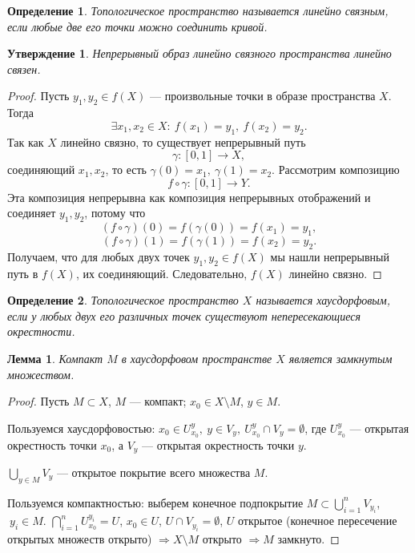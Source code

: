 \documentclass[12pt]{article}
\theoremstyle{plain}
\newtheorem{subtheorem}{Утверждение}[section]
\newtheorem{lemma}{Лемма}[section]
\newtheorem{definition}{Определение}[section]
\begin{document}
    \begin{definition}
        Топологическое пространство называется \textit{линейно связным}, если любые две его точки можно соединить кривой.
    \end{definition}
    \begin{subtheorem}
        Непрерывный образ линейно связного пространства линейно связен.
    \end{subtheorem}
    \begin{proof}
        Пусть $y_1, y_2 \in f(X)$ — произвольные точки в образе пространства $X$. Тогда $$\exists x_1, x_2 \in X: \ f(x_1) = y_1, \ f(x_2) = y_2.$$
        Так как $X$ линейно связно, то существует непрерывный путь 
        \[\gamma: [0,1] \to X,\]
        соединяющий $x_1, x_2$, то есть $\gamma(0) = x_1, \ \gamma(1) = x_2$.
        Рассмотрим композицию
        \[f \circ \gamma: [0,1] \to Y.\]
        Эта композиция непрерывна как композиция непрерывных отображений и соединяет $y_1, y_2$, потому что 
        \[(f \circ \gamma)(0) = f(\gamma(0)) = f(x_1) = y_1,\]
        \[(f \circ \gamma)(1) = f(\gamma(1)) = f(x_2) = y_2.\]
        Получаем, что для любых двух точек $y_1, y_2 \in f(X)$ мы нашли непрерывный путь в $f(X)$, их соединяющий. Следовательно, $f(X)$ линейно связно.
    \end{proof}
    \begin{definition}
        Топологическое пространство $X$ называется \textit{хаусдорфовым}, если у любых двух его различных точек существуют непересекающиеся окрестности.
    \end{definition}
    \begin{lemma}
        Компакт $M$ в хаусдорфовом пространстве $X$ является замкнутым множеством.
    \end{lemma}
    \begin{proof}
        Пусть $M \subset X$, $M$ — компакт;
        $x_0 \in X \setminus M$, $y \in M$.

        Пользуемся хаусдорфовостью: $x_0 \in U_{x_0}^y, \ y \in V_y, \ U_{x_0}^y \cap V_y = \emptyset$, где $U_{x_0}^y$ — открытая окрестность точки $x_0$, а $V_y$ — открытая окрестность точки $y$.

        $\bigcup_{y \in M} V_y$ — открытое покрытие всего множества $M$.

        Пользуемся компактностью: выберем конечное подпокрытие $M \subset \bigcup_{i = 1}^n V_{y_i}$, $\ y_i \in M$.
        $\bigcap_{i = 1}^n U_{x_0}^{y_i} = U$, $x_0 \in U$, $U \cap V_{y_i} = \emptyset$, $U$ открытое (конечное пересечение открытых множеств открыто) $\Longrightarrow X \setminus M$ открыто $\Longrightarrow M$ замкнуто.
    \end{proof}
\end{document}
